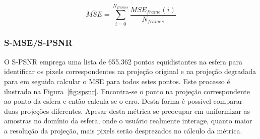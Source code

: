 \begin{equation}
        \bar{MSE} = \sum^{N_{frames}}_{i=0} \dfrac{MSE_{frame}(i)}{N_{frames}}
        \label{eq:agerage_MSE}
\end{equation}

\subsubsection{S-MSE/S-PSNR}

O S-PSNR emprega uma lista de 655.362 pontos equidistantes na esfera para identificar os pixels correspondentes na projeção original e na projeção degradada para em seguida calcular o MSE para todos estes pontos. Este processo é ilustrado na Figura~\ref{fig:spsnr}. Encontra-se o ponto na projeção correspondente ao ponto da esfera e então calcula-se o erro. Desta forma é possível comparar duas projeções diferentes. Apesar desta métrica se preocupar em uniformizar as amostras no domínio da esfera, onde o usuário realmente interage, quanto maior a resolução da projeção, mais pixels serão desprezados no cálculo da métrica.

\begin{figure}[h]
        \centering
        \quad
\end{figure}

